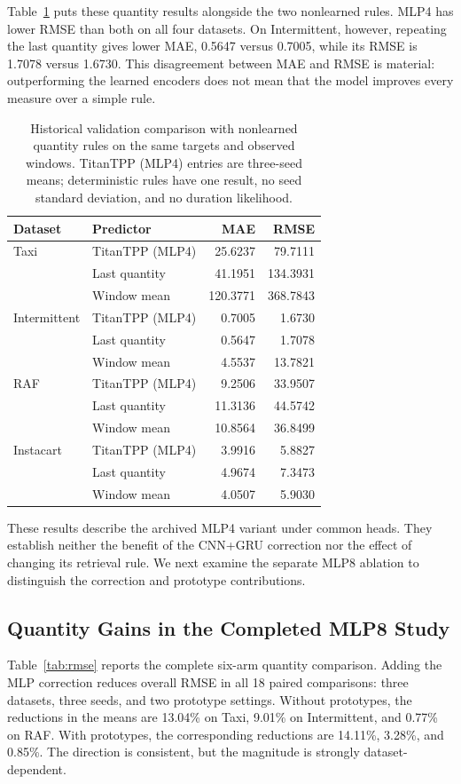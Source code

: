 \documentclass[runningheads]{llncs}
\begin{document}
Table~\ref{tab:external-simple} puts these quantity results alongside the two nonlearned rules. MLP4 has lower RMSE than both on all four datasets. On Intermittent, however, repeating the last quantity gives lower MAE, 0.5647 versus 0.7005, while its RMSE is 1.7078 versus 1.6730. This disagreement between MAE and RMSE is material: outperforming the learned encoders does not mean that the model improves every measure over a simple rule.

\begin{table}[t]
\caption{Historical validation comparison with nonlearned quantity rules on the same targets and observed windows. TitanTPP (MLP4) entries are three-seed means; deterministic rules have one result, no seed standard deviation, and no duration likelihood.}
\label{tab:external-simple}\centering\small
\begin{tabular}{llrr}
\toprule
Dataset & Predictor & MAE & RMSE\\
\midrule
Taxi & TitanTPP (MLP4) & 25.6237 & 79.7111\\
 & Last quantity & 41.1951 & 134.3931\\
 & Window mean & 120.3771 & 368.7843\\
\midrule
Intermittent & TitanTPP (MLP4) & 0.7005 & 1.6730\\
 & Last quantity & 0.5647 & 1.7078\\
 & Window mean & 4.5537 & 13.7821\\
\midrule
RAF & TitanTPP (MLP4) & 9.2506 & 33.9507\\
 & Last quantity & 11.3136 & 44.5742\\
 & Window mean & 10.8564 & 36.8499\\
\midrule
Instacart & TitanTPP (MLP4) & 3.9916 & 5.8827\\
 & Last quantity & 4.9674 & 7.3473\\
 & Window mean & 4.0507 & 5.9030\\
\bottomrule
\end{tabular}
\end{table}


These results describe the archived MLP4 variant under common heads. They establish neither the benefit of the CNN+GRU correction nor the effect of changing its retrieval rule. We next examine the separate MLP8 ablation to distinguish the correction and prototype contributions.

\subsection{Quantity Gains in the Completed MLP8 Study}
Table~\ref{tab:rmse} reports the complete six-arm quantity comparison. Adding the MLP correction reduces overall RMSE in all 18 paired comparisons: three datasets, three seeds, and two prototype settings. Without prototypes, the reductions in the means are 13.04\% on Taxi, 9.01\% on Intermittent, and 0.77\% on RAF. With prototypes, the corresponding reductions are 14.11\%, 3.28\%, and 0.85\%. The direction is consistent, but the magnitude is strongly dataset-dependent.
\end{document}
